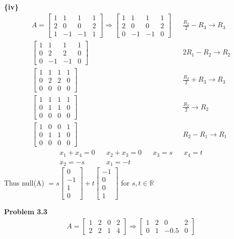 \documentclass{article}
\begin{document}
\textbf{\{iv\}}
\begin{align*} A =
    \begin{bmatrix}
        1 & 1 & 1 & 1 \\
        2 & 0 & 0 & 2 \\
        1 & -1 & -1 & 1
    \end{bmatrix} \Rightarrow
    \begin{bmatrix}
        1 & 1 & 1 & 1 \\
        2 & 0 & 0 & 2 \\
        0 & -1 & -1 & 0
    \end{bmatrix} && \frac{R_2}{2} - R_3 \xrightarrow{} R_3 \\
    \begin{bmatrix}
        1 & 1 & 1 & 1 \\
        0 & 2 & 2 & 0 \\
        0 & -1 & -1 & 0
    \end{bmatrix} && 2R_1 - R_2 \xrightarrow{} R_2 \\
    \begin{bmatrix}
        1 & 1 & 1 & 1 \\
        0 & 2 & 2 & 0 \\
        0 & 0 & 0 & 0
    \end{bmatrix} 
    && \frac{R_2}{2} + R_3 \xrightarrow{} R_3 \\
    \begin{bmatrix}
        1 & 1 & 1 & 1 \\
        0 & 1 & 1 & 0 \\
        0 & 0 & 0 & 0
    \end{bmatrix} 
    && \frac{R_2}{2} \xrightarrow{} R_2 \\
    \begin{bmatrix}
        1 & 0 & 0 & 1 \\
        0 & 1 & 1 & 0 \\
        0 & 0 & 0 & 0
    \end{bmatrix}
    && R_2 - R_1 \xrightarrow{} R_1
\end{align*}
\begin{align*}
    x_1 + x_4 = 0 && x_2 + x_3 = 0 && x_3 = s && x_4 = t \\
    x_2 = -s && x_1 = -t
\end{align*} Thus null(A) $ = s\begin{bmatrix} 0 \\ -1 \\ 1 \\ 0\end{bmatrix} + t\begin{bmatrix} -1 \\ 0 \\ 0 \\ 1\end{bmatrix} $   for $s,t \in \mathbb{R}$ \newline

\textbf{Problem 3.3} 
\begin{align*} A = 
    \begin{bmatrix}
      1 & 2 & 0 & 2 \\
      2 & 2 & 1 & 4
    \end{bmatrix} \Rightarrow
    \begin{bmatrix}
      1 & 2 & 0 & 2 \\
      0 & 1 & -0.5 & 0
    \end{bmatrix}
\end{align*}
\end{document}
